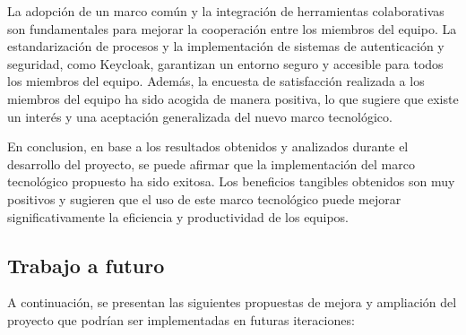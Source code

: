 La adopción de un marco común y la integración de herramientas colaborativas 
son fundamentales para mejorar la cooperación entre los miembros del equipo. 
La estandarización de procesos y la implementación de sistemas de autenticación 
y seguridad, como Keycloak, garantizan un entorno seguro y accesible para todos 
los miembros del equipo. Además, la encuesta de satisfacción realizada a los
miembros del equipo ha sido acogida de manera positiva, lo que sugiere que
existe un interés y una aceptación generalizada del nuevo marco tecnológico.\medskip

En conclusion, en base a los resultados obtenidos y analizados durante el desarrollo
del proyecto, se puede afirmar que la implementación del marco tecnológico propuesto
ha sido exitosa. Los beneficios tangibles obtenidos son muy positivos y sugieren que
el uso de este marco tecnológico puede mejorar significativamente la eficiencia y
productividad de los equipos.

\subsection{Trabajo a futuro}
A continuación, se presentan las siguientes propuestas de mejora y ampliación
del proyecto que podrían ser implementadas en futuras iteraciones:


